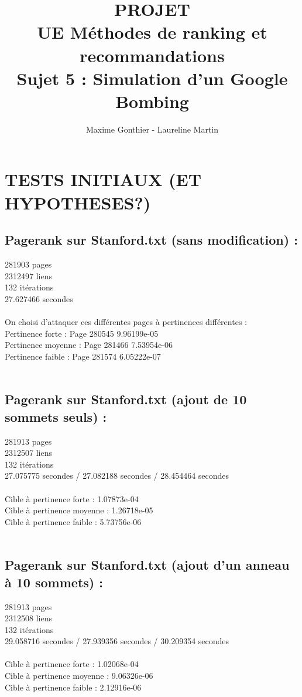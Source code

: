 \documentclass[a4paper,11pt]{article}
\title{PROJET\\ UE Méthodes de ranking et recommandations\\ 
		Sujet 5 : Simulation d'un Google Bombing}
\author{Maxime Gonthier - Laureline Martin}
\begin{document}
\clearpage
	\maketitle

\newpage
\tableofcontents

\newpage
\section{TESTS INITIAUX (ET HYPOTHESES?)}
	\subsection{Pagerank sur Stanford.txt (sans modification) :}
		281903 pages\\
		2312497 liens\\
		132 itérations\\
		27.627466 secondes\\
		\\
		On choisi d'attaquer ces différentes pages à pertinences différentes :\\
		Pertinence forte : Page 280545 9.96199e-05\\
		Pertinence moyenne : Page 281466 7.53954e-06\\
		Pertinence faible : Page 281574 6.05222e-07\\
		\\
	\subsection{Pagerank sur Stanford.txt (ajout de 10 sommets seuls) :}
		281913 pages\\
		2312507 liens\\
		132 itérations\\
		27.075775 secondes / 27.082188 secondes / 28.454464 secondes\\
		\\
		Cible à pertinence forte : 1.07873e-04\\
		Cible à pertinence moyenne : 1.26718e-05\\
		Cible à pertinence faible : 5.73756e-06\\
		\\
	\subsection{Pagerank sur Stanford.txt (ajout d'un anneau à 10 sommets) :}
		281913 pages\\
		2312508 liens\\
		132 itérations\\
		29.058716 secondes / 27.939356 secondes / 30.209354 secondes\\
		\\
		Cible à pertinence forte : 1.02068e-04\\
		Cible à pertinence moyenne : 9.06326e-06\\
		Cible à pertinence faible : 2.12916e-06\\
		\\
\end{document}
